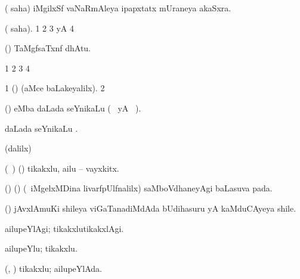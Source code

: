 \bentry
{} 
\gl{\nA}
\bmng
( saha) iMgilxSf vaNaRmAleya ipapxtatx mUraneya akaSxra. 
\emng
\eentry

\bentry
{}
\gl{\saMkiSx}
\expl{}
\bmng
( saha). 
\bnum
\num{1}  
\num{2}  
\num{3}  yA  
\num{4}  
\enum
\emng
\eentry

\bentry
{}
\pron{}
\gl{\saMkeV}
\expl{}
\bmng
(\ravi) TaMgfsaTxnf dhAtu. 
\emng
\eentry

\bentry
{}
\gl{\saMkiSx}
\expl{}
\bmng
\bnum
\num{1}  
\num{2}  
\num{3}  
\num{4}  
\enum
\emng
\eentry


\bentry
{}
\gl{\saMkiSx}
\expl{}
\bmng
\bnum
\num{1} (\ame)  (aMce baLakeyalilx). 
\num{2}  
\enum
\emng
\eentry


\bentry
{} 
\gl{\nA}
\expl{}
\bmng
(\ca)  eMba daLada seYnikaLu (\birx\  yA \ame\ ). 
\emng
\eentry


\bentry
{} 
\gl{\nA}
\expl{}
\bmng
{} daLada seYnikaLu . 
\emng
\eentry

\bentry
{}
\gl{\saMkiSx}
\expl{}
\bmng
(\ame dalilx)  
\emng
\eentry

\bentry
{} 
\gl{\nA}
\expl{}
\bmng
(\kanmu\ \ame) (\ashi) tikakxlu, ailu -- vayxkitx. 
\emng
\eentry

\bentry
{} 
\gl{\nA}
\expl{}
\bmng
(\birx) (\pArxM) (\kanmu\ iMgelxMDina livarfpUlfnalilx) saMboVdhaneyAgi baLasuva pada. 
\emng
\eentry

\bentry
{} 
\gl{\nA}
\expl{}
\bmng
(\ca) jAvxlAmuKi shileya viGaTanadiMdAda bUdihasuru yA kaMduCAyeya shile. 
\emng
\eentry

\bentry
{} 
\gl{\kirxvi}
\expl{}
\bmng
ailupeYlAgi; tikakxlutikakxlAgi. 
\emng
\eentry

\bentry
{} 
\gl{\nA}
\expl{}
\bmng
ailupeYlu; tikakxlu. 
\emng
\eentry

\bentry
{} 
\gl{\gu}
\expl{}
\bmng
(\ame, \ashi) tikakxlu; ailupeYlAda. 
\emng
\eentry

